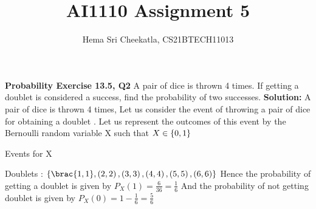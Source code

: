 \documentclass[journal,12pt,twocolumn]{IEEEtran}
\begin{document}
\makeatother
\let\StandardTheFigure\thefigure
\let\vec\mathbf
\renewcommand{\thefigure}{\theproblem}
\def\putbox#1#2#3{\makebox[0in][l]{\makebox[#1][l]{}\raisebox{\baselineskip}[0in][0in]{\raisebox{#2}[0in][0in]{#3}}}}
     \def\rightbox#1{\makebox[0in][r]{#1}}
     \def\centbox#1{\makebox[0in]{#1}}
     \def\topbox#1{\raisebox{-\baselineskip}[0in][0in]{#1}}
     \def\midbox#1{\raisebox{-0.5\baselineskip}[0in][0in]{#1}}
\vspace{3cm}
\title{AI1110 Assignment 5}
\author{ Hema Sri Cheekatla, CS21BTECH11013}	
\maketitle
\begin{flushleft}
\textbf{Probability Exercise 13.5, Q2}
A pair of dice is thrown 4 times. If getting a doublet is considered a success, find
the probability of two successes.
\textbf{Solution:}
A pair of dice is thrown 4 times,\newline
Let us consider the event of throwing a pair of dice for obtaining a doublet . Let us represent the outcomes of this event by the Bernoulli random variable X such that $X \in \left\{0, 1\right\}$ \newline
\begin{table}[h]
    \centering
	\caption{Events for X}
	\label{tab:mesh}
	
\end{table}

Doublets : $\cbrak{\brac{1, 1}, \brak{2, 2}, \brak{3, 3}, \brak{4, 4}, \brak{5, 5}, \brak{6, 6}}$\newline
Hence the probability of getting a doublet is given by $P_X(1) = \frac{6}{36} = \frac{1}{6}$ \newline
And the probability of not getting doublet is given by $P_X(0) = 1-\frac{1}{6} = \frac{5}{6}$ \newline


\end{flushleft}
\end{document}
